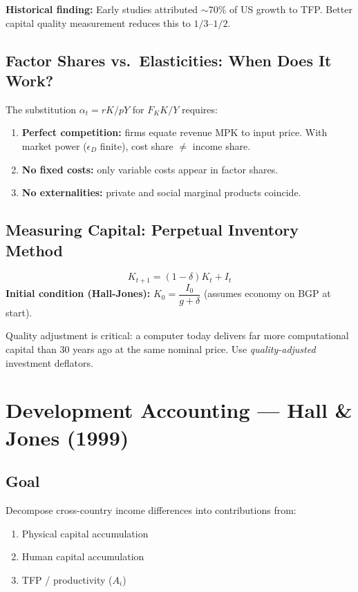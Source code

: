 \documentclass[a4paper,11pt]{article}
\begin{document}
\textbf{Historical finding:} Early studies attributed $\sim$70\% of US growth to TFP. Better capital quality measurement reduces this to $1/3$--$1/2$.

\subsection*{Factor Shares vs.\ Elasticities: When Does It Work?}

The substitution $\alpha_t = rK/pY$ for $F_K K/Y$ requires:
\begin{enumerate}[noitemsep]
    \item \textbf{Perfect competition:} firms equate revenue MPK to input price. With market power ($\epsilon_D$ finite), cost share $\neq$ income share.
    \item \textbf{No fixed costs:} only variable costs appear in factor shares.
    \item \textbf{No externalities:} private and social marginal products coincide.
\end{enumerate}

\subsection*{Measuring Capital: Perpetual Inventory Method}

\begin{resultbox}
\[
\boxed{K_{t+1} = (1-\delta)K_t + I_t}
\tag{PIM}
\]
\textbf{Initial condition (Hall-Jones):} $K_0 = \dfrac{I_0}{g + \delta}$ (assumes economy on BGP at start).
\end{resultbox}

Quality adjustment is critical: a computer today delivers far more computational capital than 30 years ago at the same nominal price. Use \textit{quality-adjusted} investment deflators.

\clearpage

\section{Development Accounting --- Hall \& Jones (1999)}

\subsection*{Goal}
Decompose cross-country income differences into contributions from:
\begin{enumerate}[noitemsep]
    \item Physical capital accumulation
    \item Human capital accumulation
    \item TFP / productivity ($A_i$)
\end{enumerate}
\end{document}
